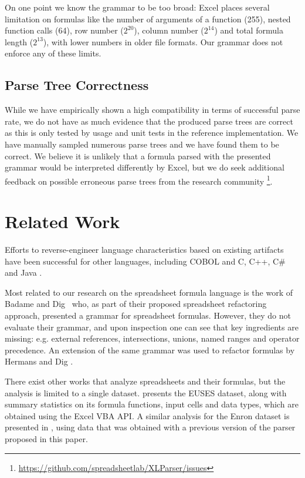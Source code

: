 \documentclass[times]{smrauth}
\begin{document}
On one point we know the grammar to be too broad: Excel places several limitation on formulas like the number of arguments of a function (255), nested function calls (64), row number ($2^{20}$), column number ($2^{14}$) and total formula length ($2^{13}$), with lower numbers in older file formats.
Our grammar does not enforce any of these limits.

\subsection{Parse Tree Correctness}

While we have empirically shown a high compatibility in terms of successful parse rate, we do not have as much evidence that the produced parse trees are correct as this is only tested by usage and unit tests in the reference implementation. We have manually sampled numerous parse trees and we have found them to be correct. We believe it is unlikely that a formula parsed with the presented grammar would be interpreted differently by Excel, but we do seek additional feedback on possible erroneous parse trees from the research community \footnote{\url{https://github.com/spreadsheetlab/XLParser/issues}}.

\section{Related Work}
\label{section:relatedWork}
Efforts to reverse-engineer language characteristics based on existing artifacts have been successful for other languages, including COBOL \cite{van1997obtaining} and C, C++, C\# and Java \cite{zaytsev2010recovery}.

Most related to our research on the spreadsheet formula language is the work of Badame and Dig~\cite{badame2012refactoring} who, as part of their proposed spreadsheet refactoring approach, presented a grammar for spreadsheet formulas. However, they do not evaluate their grammar, and upon inspection one can see that key ingredients are missing: e.g. external references, intersections, unions, named ranges and operator precedence. An extension of the same grammar was used to refactor formulas by Hermans and Dig \cite{hermans2014bumblebee}.

There exist other works that analyze spreadsheets and their formulas, but the analysis is limited to a single dataset. \cite{euses} presents the EUSES dataset, along with summary statistics on its formula functions, input cells and data types, which are obtained using the Excel VBA API. A similar analysis for the Enron dataset is presented in \cite{enron}, using data that was obtained with a previous version of the parser proposed in this paper.
\end{document}
